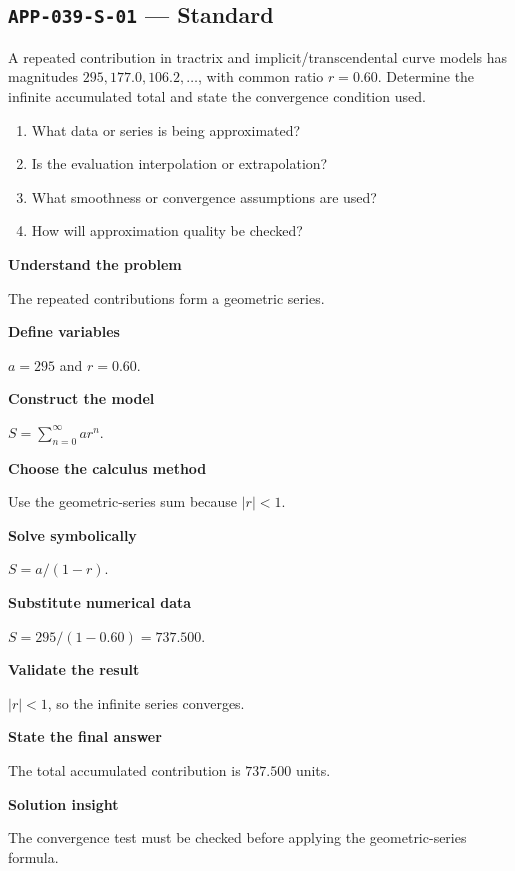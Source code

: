 \documentclass[11pt]{book}
\newcommand{\pid}[1]{\texttt{#1}}
\begin{document}
\subsection*{\pid{APP-039-S-01} — Standard}
\begin{problembox}
A repeated contribution in tractrix and implicit/transcendental curve models has magnitudes $295, 177.0, 106.2,\ldots$, with common ratio $r=0.60$. Determine the infinite accumulated total and state the convergence condition used.
\end{problembox}
\begin{promptbox}\begin{enumerate}
\item What data or series is being approximated?
\item Is the evaluation interpolation or extrapolation?
\item What smoothness or convergence assumptions are used?
\item How will approximation quality be checked?
\end{enumerate}\end{promptbox}
\begin{solutionbox}
\textbf{Understand the problem}\par The repeated contributions form a geometric series.\par\medskip
\textbf{Define variables}\par $a=295$ and $r=0.60$.\par\medskip
\textbf{Construct the model}\par $S=\sum_{n=0}^{\infty}ar^n$.\par\medskip
\textbf{Choose the calculus method}\par Use the geometric-series sum because $|r|<1$.\par\medskip
\textbf{Solve symbolically}\par $S=a/(1-r)$.\par\medskip
\textbf{Substitute numerical data}\par $S=295/(1-0.60)=737.500$.\par\medskip
\textbf{Validate the result}\par $|r|<1$, so the infinite series converges.\par\medskip
\textbf{State the final answer}\par The total accumulated contribution is $737.500$ units.\par\medskip
\textbf{Solution insight}\par The convergence test must be checked before applying the geometric-series formula.\par\medskip
\end{solutionbox}
\end{document}
